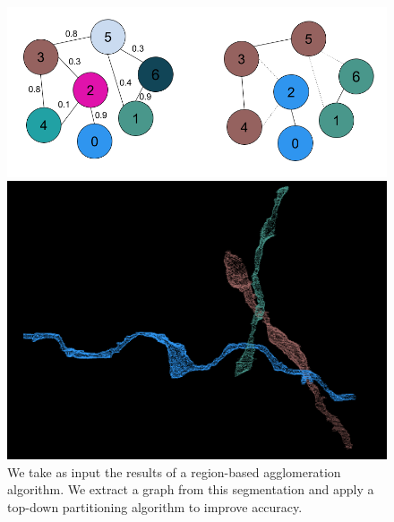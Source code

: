\documentclass[10pt,twocolumn,letterpaper]{article}
\begin{document}
\begin{figure}[t]
\begin{minipage}{\textwidth}
\begin{minipage}{0.24\textwidth}
		\end{minipage}
		\begin{minipage}{0.34\textwidth}
			\includegraphics[width=\linewidth]{figures/schema/multicut-graph.png}
		\end{minipage}
		\begin{minipage}{0.24\textwidth}
			\includegraphics[width=\linewidth]{figures/schema/post-multicut.png}
		\end{minipage}
		\caption{We take as input the results of a region-based agglomeration algorithm. We extract a graph from this segmentation and apply a top-down partitioning algorithm to improve accuracy.}
		\label{fig:teaser}
	\end{minipage}
\end{figure}
\end{document}

